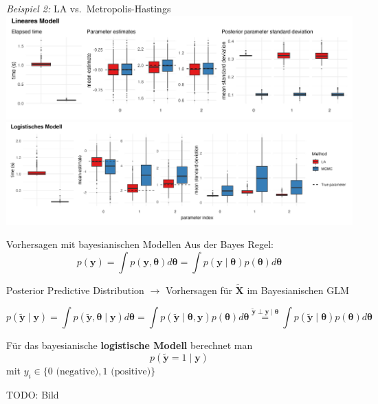 \documentclass[
  ignorenonframetext,
  aspectratio=169,
]{beamer}
\newcommand{\by}{\bm{y}}
\newcommand{\btheta}{\bm{\theta}}
\newcommand{\ty}{\tilde{\bm{y}}}
\newcommand{\tX}{\tilde{\bm{X}}}
\begin{document}
\begin{frame}{\emph{Beispiel 2:} LA vs.~Metropolis-Hastings}
\protect{}\label{beispiel-2-la-vs.-metropolis-hastings}
\includegraphics[width=0.85\linewidth,height=\textheight,keepaspectratio]{../figures/approx_plot_regr.png}
\includegraphics[width=0.97\linewidth,height=\textheight,keepaspectratio]{../figures/approx_plot_class.png}
\end{frame}

\begin{frame}{Vorhersagen mit bayesianischen Modellen}
\protect{}\label{vorhersagen-mit-bayesianischen-modellen}
Aus der Bayes Regel:
\[p(\by) = \int p(\by, \btheta) d\btheta = \int p(\by \mid \btheta) p(\btheta) d\btheta\]

\begin{block}{Posterior Predictive Distribution}
\protect{}\label{posterior-predictive-distribution}
\(\to\) Vorhersagen für \(\tX\) im Bayesianischen GLM
\autocite{box_sampling_1980,barbieri_posterior_2015}

\[
p(\ty \mid \by) = \int p(\ty, \btheta \mid \by) d \btheta 
    = \int p(\ty \mid \btheta, \by) p(\btheta) d \btheta
    \overset{\ty \perp \by \mid \btheta}{=}  \int p(\ty \mid \btheta) p(\btheta) d \btheta
\]
\end{block}

Für das bayesianische \textbf{logistische Modell} berechnet man
\[p(\ty = 1 \mid \by)\] mit
\(y_i \in \{0 \text{ (negative)}, 1 \text{ (positive)}\}\)

TODO: Bild
\end{frame}
\end{document}
